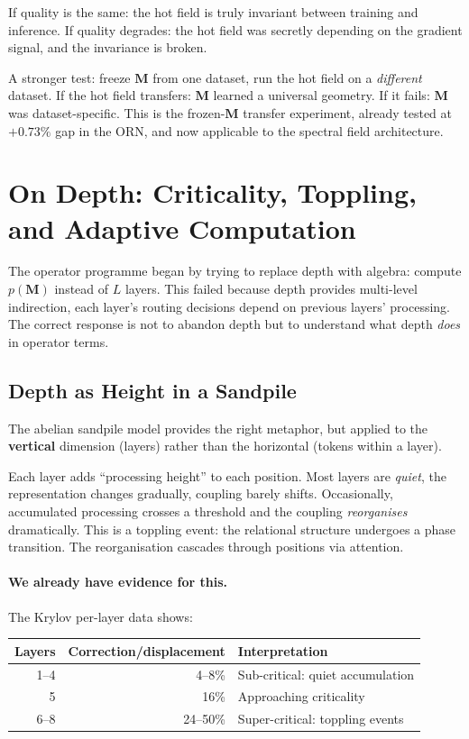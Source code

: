 \documentclass[11pt, a4paper]{article}
\newcommand{\M}{\mathbf{M}}
\theoremstyle{plain}
\theoremstyle{definition}
\theoremstyle{remark}
\begin{document}
If quality is the same: the hot field is truly invariant between training and inference.
If quality degrades: the hot field was secretly depending on the gradient signal, and the invariance is broken.

A stronger test: freeze $\M$ from one dataset, run the hot field on a \emph{different} dataset.
If the hot field transfers: $\M$ learned a universal geometry.
If it fails: $\M$ was dataset-specific.
This is the frozen-$\M$ transfer experiment, already tested at $+0.73\%$ gap in the ORN, and now applicable to the spectral field architecture.


\section{On Depth: Criticality, Toppling, and Adaptive Computation}
\label{sec:on-depth}

The operator programme began by trying to replace depth with algebra: compute $p(\M)$ instead of $L$ layers.
This failed because depth provides multi-level indirection, each layer's routing decisions depend on previous layers' processing.
The correct response is not to abandon depth but to understand what depth \emph{does} in operator terms.

\subsection{Depth as Height in a Sandpile}

The abelian sandpile model provides the right metaphor, but applied to the \textbf{vertical} dimension (layers) rather than the horizontal (tokens within a layer).

Each layer adds ``processing height'' to each position.
Most layers are \emph{quiet}, the representation changes gradually, coupling barely shifts.
Occasionally, accumulated processing crosses a threshold and the coupling \emph{reorganises} dramatically.
This is a toppling event: the relational structure undergoes a phase transition.
The reorganisation cascades through positions via attention.

\paragraph{We already have evidence for this.}
The Krylov per-layer data shows:
\begin{center}\small
\begin{tabular}{rrl}
\toprule
\textbf{Layers} & \textbf{Correction/displacement} & \textbf{Interpretation} \\
\midrule
1--4 & 4--8\% & Sub-critical: quiet accumulation \\
5 & 16\% & Approaching criticality \\
6--8 & 24--50\% & Super-critical: toppling events \\
\bottomrule
\end{tabular}
\end{center}
\end{document}
